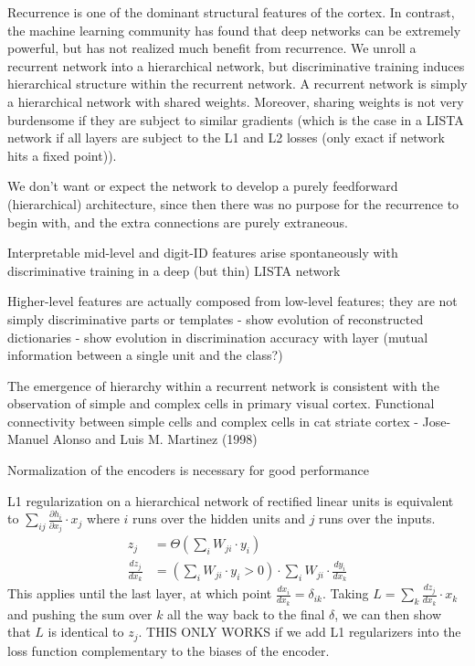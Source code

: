 Recurrence is one of the dominant structural features of the cortex.  In contrast, the machine learning community has found that deep networks can be extremely powerful, but has not realized much benefit from recurrence.  We unroll a recurrent network into a hierarchical network, but discriminative training induces hierarchical structure within the recurrent network.  A recurrent network is simply a hierarchical network with shared weights.  Moreover, sharing weights is not very burdensome if they are subject to similar gradients (which is the case in a LISTA network if all layers are subject to the L1 and L2 losses (only exact if network hits a fixed point)).  

We don't want or expect the network to develop a purely feedforward (hierarchical) architecture, since then there was no purpose for the recurrence to begin with, and the extra connections are purely extraneous.

Interpretable mid-level and digit-ID features arise spontaneously with discriminative training in a deep (but thin) LISTA network

Higher-level features are actually composed from low-level features; they are not simply discriminative parts or templates
  - show evolution of reconstructed dictionaries
  - show evolution in discrimination accuracy with layer (mutual information between a single unit and the class?)

The emergence of hierarchy within a recurrent network is consistent with the observation of simple and complex cells in primary visual cortex.  
Functional connectivity between simple cells and complex cells in cat striate cortex - Jose-Manuel Alonso and Luis M. Martinez (1998)

Normalization of the encoders is necessary for good performance

L1 regularization on a hierarchical network of rectified linear units is equivalent to $\sum_{ij} \frac{\partial h_i}{\partial x_j} \cdot x_j$ where $i$ runs over the hidden units and $j$ runs over the inputs.  
\begin{align*}
z_j &= \Theta\left(\sum_i W_{ji} \cdot y_i \right) \\
\frac{d z_j}{d x_k} &= \left( \sum_i W_{ji} \cdot y_i > 0 \right) \cdot \sum_i W_{ji} \cdot \frac{d y_i}{d x_k} 
\end{align*}
This applies until the last layer, at which point $\frac{d x_i}{d x_k} = \delta_{ik}$.  Taking $L = \sum_k \frac{d z_j}{d x_k} \cdot x_k$ and pushing the sum over $k$ all the way back to the final $\delta$, we can then show that $L$ is identical to $z_j$.  THIS ONLY WORKS if we add L1 regularizers into the loss function complementary to the biases of the encoder.

